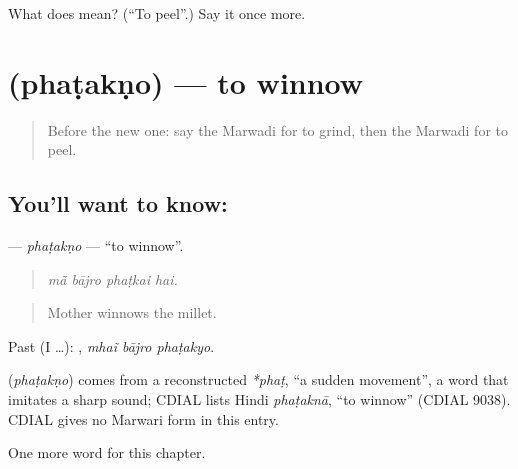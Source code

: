 \begin{tcolorbox}[breakable,colback=teal!4,colframe=teal!35!black,title={Before you move on}]
What does  mean? (\textquotedblleft{}To peel\textquotedblright{}.) Say it once more.
\end{tcolorbox}
\section[\texorpdfstring{\mw{फटकणो} (phaṭakṇo)}{फटकणो (phaṭakṇo)}]{ (phaṭakṇo) — to winnow}

\label{lesson:MW-C179-phatakno}



\begin{quote}
Before the new one: say the Marwadi for to grind, then the Marwadi for to peel.
\end{quote}

\subsection*{You'll want to know: }
\textbf{} — \emph{phaṭakṇo} — \textquotedblleft{}to winnow\textquotedblright{}.

\begin{quote}
   
\end{quote}

\begin{quote}
\emph{mā̃ bājro phaṭkai hai.}
\end{quote}

\begin{quote}
Mother winnows the millet.
\end{quote}

Past (I …):   , \emph{mhaĩ bājro phaṭakyo}.

\begin{cousinweb}
\textbf{} (\emph{phaṭakṇo}) comes from a reconstructed \emph{*phaṭ}, \textquotedblleft{}a sudden movement\textquotedblright{}, a word that imitates a sharp sound; CDIAL lists Hindi \emph{phaṭaknā}, \textquotedblleft{}to winnow\textquotedblright{} (CDIAL 9038). CDIAL gives no Marwari form in this entry.
\end{cousinweb}

\begin{grammarlens}[title={What you've built}]
One more word for this chapter.
\end{grammarlens}

